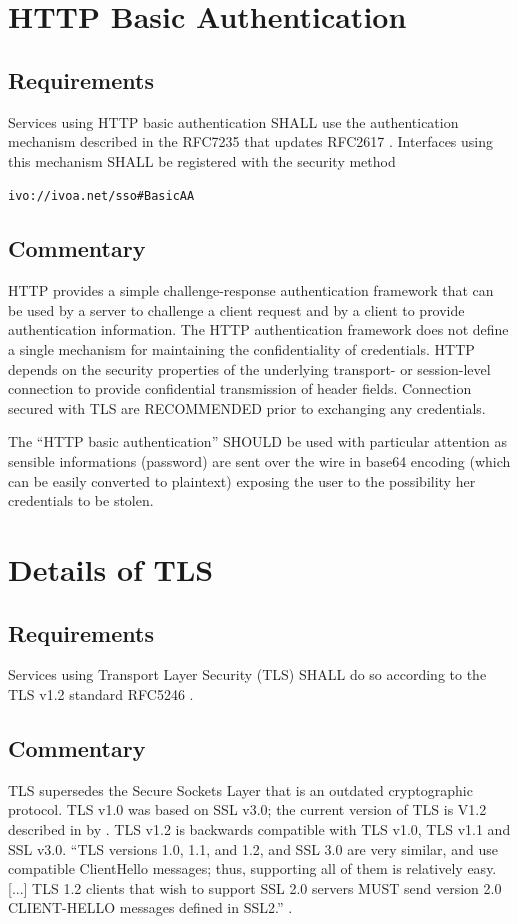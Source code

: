 \documentclass[11pt,a4paper]{ivoa}
\begin{document}
\section{HTTP Basic Authentication}
\subsection{Requirements}
Services using HTTP basic authentication SHALL use the authentication mechanism described in the RFC7235 \citep{std:RFC7235}
that updates RFC2617  \citep{std:RFC2617}. 
Interfaces using this mechanism SHALL be registered with the security method 

 \texttt{ivo://ivoa.net/sso\#BasicAA}

\subsection{Commentary}
HTTP provides a simple challenge-response authentication framework that can be used by a server to challenge 
a client request and by a   client to provide authentication information.
The HTTP authentication framework does not define a single mechanism for maintaining the confidentiality of credentials. 
HTTP depends on the security properties of the underlying transport-   or session-level connection to provide 
confidential transmission of   header fields. Connection secured with TLS are RECOMMENDED prior to exchanging any credentials.

The ``HTTP basic authentication'' SHOULD be used with particular attention as sensible
informations (password) are sent over the wire in base64 encoding (which can be easily converted to plaintext) exposing
the user to the possibility her credentials to be stolen.

\section{Details of TLS}
\subsection{Requirements}
Services using Transport Layer Security (TLS) SHALL do so according to the TLS v1.2 standard RFC5246 \citep{std:RFC5246}.

\subsection{Commentary}
TLS supersedes the Secure Sockets Layer that is an outdated cryptographic protocol.   
TLS v1.0 was based on SSL v3.0; the current version of TLS is V1.2 described in by \citet{std:RFC5246}.  
TLS v1.2 is backwards compatible with TLS v1.0, TLS v1.1 and SSL v3.0. 
``TLS versions 1.0, 1.1, and 1.2, and SSL 3.0 are very similar, and use compatible ClientHello messages; 
thus, supporting all of them is   relatively easy.[...] TLS 1.2 clients that wish to support SSL 2.0 servers MUST 
send  version 2.0 CLIENT-HELLO messages defined in SSL2.'' \citep{std:RFC5246}.
\end{document}

